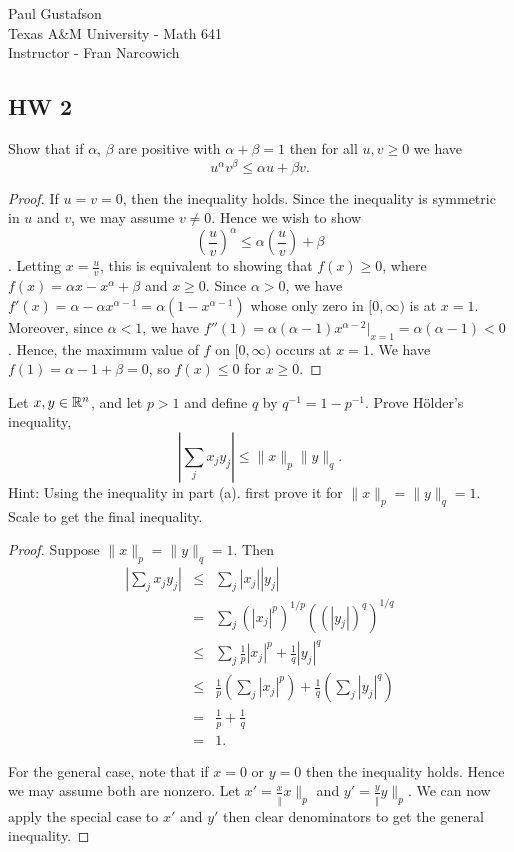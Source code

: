 \documentclass{article}
\begin{document}
\noindent Paul Gustafson\\
\noindent Texas A\&M University - Math 641\\ 
\noindent Instructor - Fran Narcowich

\subsection*{HW 2}
 Show that if $\alpha$, $\beta$ are positive with $\alpha + \beta = 1$ then for all $u,v \ge 0$ we have
$$ u^\alpha v^\beta \le \alpha u + \beta v.$$
\begin{proof} If $u = v = 0$, then the inequality holds. Since the inequality is symmetric in $u$ and $v$, we may assume $v \neq 0$.
Hence we wish to show
$$(\frac u v)^\alpha \le \alpha (\frac u v) + \beta$$.
Letting $x = \frac u v$, this is equivalent to showing that $f(x) \ge 0$, where $f(x) = \alpha x -  x^\alpha + \beta$ and $x \ge 0$.  
Since $\alpha > 0$, we have $f'(x) = \alpha - \alpha x^{\alpha - 1} = \alpha (1 - x^{\alpha - 1})$ whose only zero in $[0,\infty)$ is at $x = 1$.
Moreover, since $\alpha < 1$, we have $f''(1) = \alpha (\alpha - 1) x^{\alpha - 2}|_{x = 1} = \alpha (\alpha - 1)  < 0$ . Hence, the maximum value of $f$ on $[0, \infty)$ occurs at $x = 1$.
We have $f(1) = \alpha -1 + \beta = 0$, so $f(x) \le 0$ for $x \ge 0$.
\end{proof}

 Let $x,y \in \mathbb{R}^n$, and let $p > 1$ and define $q$ by $q^{-1} = 1 − p^{−1}$. Prove H\"{o}lder's inequality, 
$$|\sum_j x_j y_j| ≤ \|x\|_p \|y\|_q. $$
Hint: Using the inequality in part (a). first prove it for $\|x\|_p = \|y\|_q = 1$. Scale to get the final inequality.
\begin{proof}
Suppose $\|x\|_p = \|y\|_q = 1$. Then
\begin{align*}
| \sum_j x_j y_j | & \le & \sum_j |x_j| |y_j|
\\ &  = &  \sum_j (|x_j|^p)^{1/p} ((|y_j|)^q)^{1/q}
\\ & \le & \sum_j \frac 1 p |x_j|^p + \frac 1 q |y_j|^q
\\ & \le & \frac 1 p (\sum_j  |x_j|^p) + \frac 1 q (\sum_j |y_j|^q)
\\ & = & \frac 1 p + \frac 1 q
\\ & = & 1.
\end{align*}

For the general case, note that if $x = 0$ or $y = 0$ then the inequality holds. Hence we may assume both are nonzero.  
Let $x' = \frac x \|x\|_p$ and $y' = \frac y \|y\|_p$.  We can now apply the special case to $x'$ and $y'$ then clear denominators to get the general inequality.
\end{proof}
\end{document}
